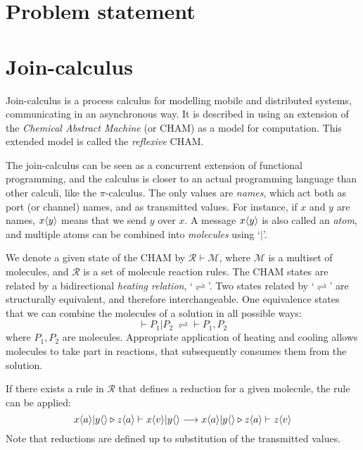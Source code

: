 \section{Problem statement}

\section{Join-calculus}

Join-calculus is a process calculus for modelling mobile and distributed
systems, communicating in an asynchronous way. It is described in
\cite{fournet1996reflexive} using an extension of the \emph{Chemical Abstract
Machine}\cite{berry1989chemical} (or CHAM) as a model for computation. This
extended model is called the \emph{reflexive} CHAM.

The join-calculus can be seen as a concurrent extension of functional
programming, and the calculus is closer to an actual programming language than
other calculi, like the $\pi$-calculus. The only values are \emph{names}, which
act both as port (or channel) names, and as transmitted values. For instance, if
$x$ and $y$ are names, $\S{x}{y}$ means that we send $y$ over $x$. A message
$\S{x}{y}$ is also called an \emph{atom}, and multiple atoms can be combined
into \emph{molecules} using `$|$'.

We denote a given state of the CHAM by $\mathcal{R} \vdash \mathcal{M}$, where
$\mathcal{M}$ is a multiset of molecules, and $\mathcal{R}$ is a set of
molecule reaction rules. The CHAM states are related by a bidirectional
\emph{heating relation}, `$\rightleftharpoons$'. Two states related by
`$\rightleftharpoons$' are structurally equivalent, and therefore interchangeable.
One equivalence states that we can combine the molecules of a solution in all
possible ways:
$$
  \vdash P_1 | P_2 \ \rightleftharpoons{} \vdash P_1, P_2
$$
where $P_1, P_2$ are molecules. Appropriate application of heating and cooling
allows molecules to take part in reactions, that subsequently consumes them from
the solution.

If there exists a rule in $\mathcal{R}$ that defines a reduction for a given
molecule, the rule can be applied:
$$
  \S{x}{a} | \S{y}{} \triangleright \S{z}{a} \vdash \S{x}{v} | \S{y}{}
  \longrightarrow \S{x}{a} | \S{y}{} \triangleright \S{z}{a} \vdash \S{z}{v}
$$
Note that reductions are defined up to substitution of the transmitted values.
